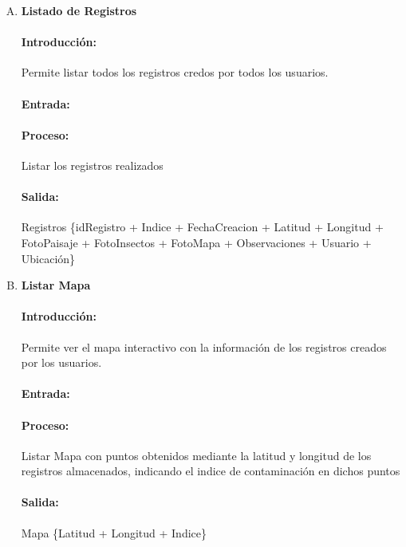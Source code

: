 \begin{enumerate}[A.]
        \item \textbf{Listado de Registros}
        
        \paragraph{Introducción:} Permite listar todos los registros credos por todos los usuarios.
        
        \paragraph{Entrada:} 
        
        \paragraph{Proceso:} Listar los registros realizados
        
        \paragraph{Salida:} Registros \{idRegistro + Indice + FechaCreacion + Latitud + Longitud + FotoPaisaje + FotoInsectos + FotoMapa + Observaciones + Usuario + Ubicación\}

        \item \textbf{Listar Mapa}
        
        \paragraph{Introducción:} Permite ver el mapa interactivo con la información de los registros creados por los usuarios.
        
        \paragraph{Entrada:} 
        
        \paragraph{Proceso:} Listar Mapa con puntos obtenidos mediante la latitud y longitud de los registros almacenados, indicando el indice de contaminación en dichos puntos
        
        \paragraph{Salida:} Mapa \{Latitud + Longitud + Indice\}

        \end{enumerate}
         
